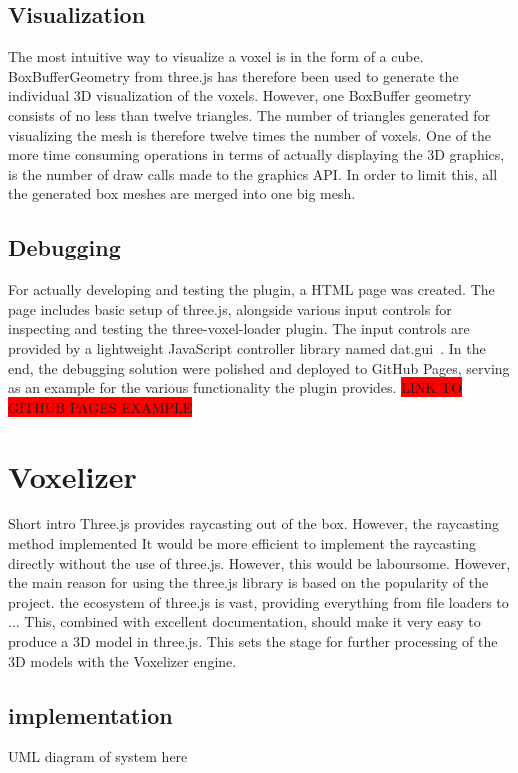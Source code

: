 \subsection{Visualization}
The most intuitive way to visualize a voxel is in the form of a cube. BoxBufferGeometry from three.js has therefore been used to generate the individual 3D visualization of the voxels. However, one BoxBuffer geometry consists of no less than twelve triangles. The number of triangles generated for visualizing the mesh is therefore twelve times the number of voxels. One of the more time consuming operations in terms of actually displaying the 3D graphics, is the number of draw calls made to the graphics API. In order to limit this, all the generated box meshes are merged into one big mesh.

\subsection{Debugging}
For actually developing and testing the plugin, a HTML page was created. The page includes basic setup of three.js, alongside various input controls for inspecting and testing the three-voxel-loader plugin. The input controls are provided by a lightweight JavaScript controller library named dat.gui~\cite{dat.gui}. In the end, the debugging solution were polished and deployed to GitHub Pages, serving as an example for the various functionality the plugin provides. \colorbox{red}{LINK TO GITHUB PAGES EXAMPLE}

\section{Voxelizer}
Short intro
Three.js provides raycasting out  of the box. However, the raycasting method implemented It would be more efficient to implement the raycasting directly without the use of three.js. However, this would be laboursome. However, the main reason for using the three.js library is based on the popularity of the project. the ecosystem of three.js is vast, providing everything from file loaders to ... This, combined with excellent documentation, should make it very easy to produce a 3D model in three.js. This sets the stage for further processing of the 3D models with the Voxelizer engine.

\subsection{implementation}
\colorbox{RubineRed}{UML diagram of system here}


